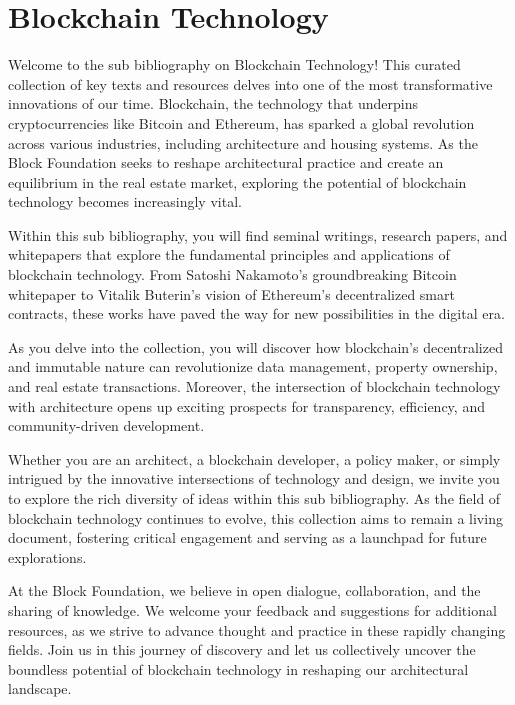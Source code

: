 \newpage
\section{Blockchain Technology}


Welcome to the sub bibliography on Blockchain Technology! This curated collection of key texts and resources delves into one of the most transformative innovations of our time. Blockchain, the technology that underpins cryptocurrencies like Bitcoin and Ethereum, has sparked a global revolution across various industries, including architecture and housing systems. As the Block Foundation seeks to reshape architectural practice and create an equilibrium in the real estate market, exploring the potential of blockchain technology becomes increasingly vital.

Within this sub bibliography, you will find seminal writings, research papers, and whitepapers that explore the fundamental principles and applications of blockchain technology. From Satoshi Nakamoto's groundbreaking Bitcoin whitepaper to Vitalik Buterin's vision of Ethereum's decentralized smart contracts, these works have paved the way for new possibilities in the digital era.

As you delve into the collection, you will discover how blockchain's decentralized and immutable nature can revolutionize data management, property ownership, and real estate transactions. Moreover, the intersection of blockchain technology with architecture opens up exciting prospects for transparency, efficiency, and community-driven development.

Whether you are an architect, a blockchain developer, a policy maker, or simply intrigued by the innovative intersections of technology and design, we invite you to explore the rich diversity of ideas within this sub bibliography. As the field of blockchain technology continues to evolve, this collection aims to remain a living document, fostering critical engagement and serving as a launchpad for future explorations.

At the Block Foundation, we believe in open dialogue, collaboration, and the sharing of knowledge. We welcome your feedback and suggestions for additional resources, as we strive to advance thought and practice in these rapidly changing fields. Join us in this journey of discovery and let us collectively uncover the boundless potential of blockchain technology in reshaping our architectural landscape.





